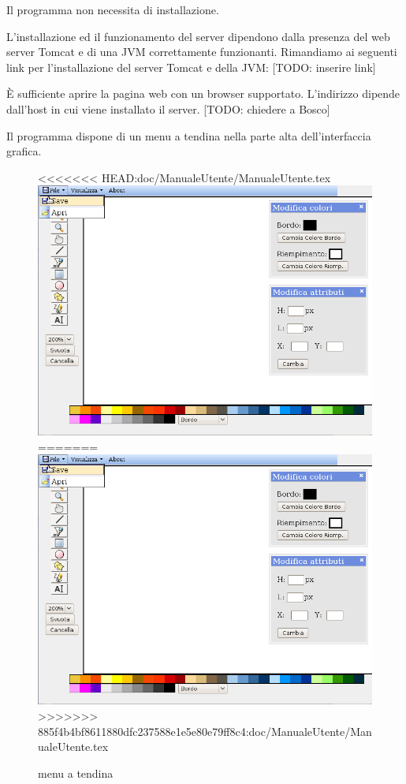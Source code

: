 
Il programma non necessita di installazione. 

L'installazione ed il funzionamento del server dipendono dalla presenza del web server Tomcat e di una JVM correttamente funzionanti. Rimandiamo ai seguenti link per l'installazione del server Tomcat e della JVM: [TODO: inserire link]
 
\`E sufficiente aprire la pagina web con un browser supportato. L'indirizzo dipende dall'host in cui viene installato il server.
[TODO: chiedere a Bosco]

Il programma dispone di un menu a tendina nella parte alta dell'interfaccia grafica.

\begin{figure}[!ht]
\centering
<<<<<<< HEAD:doc/ManualeUtente/ManualeUtente.tex
\includegraphics[scale=0.4]{images/menu.png}
=======
\includegraphics[scale=0.5]{images/menu.png}
>>>>>>> 885f4b4bf8611880dfc237588e1e5e80e79ff8c4:doc/ManualeUtente/ManualeUtente.tex
\caption{menu a tendina}
\end{figure} 

